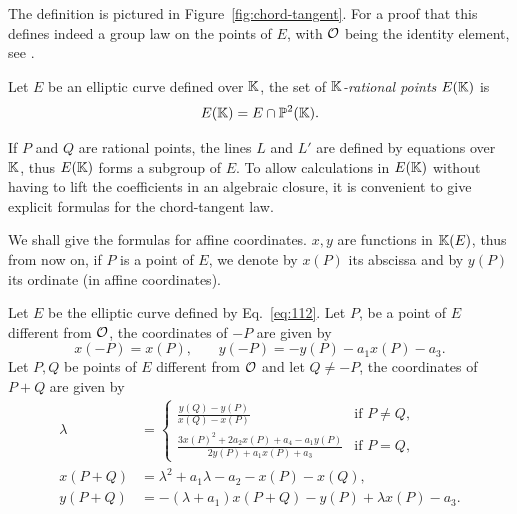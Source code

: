 The definition is pictured in Figure~\ref{fig:chord-tangent}. For a
proof that this defines indeed a group law on the points of $E$, with
$\mathcal{O}$ being the identity element, see \cite[II, $\S2$]{silverman:elliptic}.

\begin{definition}
  Let $E$ be an elliptic curve defined over $\mathbb{K}$, the set of
  \emph{$\mathbb{K}$-rational points} $E(\mathbb{K})$ is 
  \begin{equation}
    \label{eq:119}
    E(\mathbb{K}) = E \cap \mathbb{P}^2(\mathbb{K})
    \text{.}
  \end{equation}
\end{definition}

If $P$ and $Q$ are rational points, the lines $L$ and $L'$ are defined
by equations over $\mathbb{K}$, thus $E(\mathbb{K})$ forms a subgroup of $E$. To allow
calculations in $E(\mathbb{K})$ without having to lift the coefficients in an
algebraic closure, it is convenient to give explicit formulas for the
chord-tangent law. 

We shall give the formulas for affine coordinates. $x,y$ are functions
in $\mathbb{K}(E)$, thus from now on, if $P$ is a point of $E$, we denote by
$x(P)$ its abscissa and by $y(P)$ its ordinate (in affine coordinates).

\begin{proposition}
  Let $E$ be the elliptic curve defined by Eq.~\eqref{eq:112}. Let
  $P$, be a point of $E$ different from $\mathcal{O}$, the coordinates of $-P$
  are given by
  \begin{equation}
    \label{eq:120}
    x(-P) = x(P)\text{,}\qquad y(-P)=-y(P) -a_1x(P) - a_3
    \text{.}
  \end{equation}
  Let $P,Q$ be points of $E$ different from $\mathcal{O}$ and let $Q\ne-P$, the
  coordinates of $P+Q$ are given by
  \begin{equation}
    \label{eq:121}
    \begin{aligned}
      \lambda &= \begin{cases}
        \frac{y(Q) - y(P)}{x(Q) -x(P)} &\text{if $P\ne Q$,}\\
        \frac{3x(P)^2+2a_2x(P)+a_4-a_1y(P)}{2y(P)+a_1x(P)+a_3} &\text{if $P=Q$,}
      \end{cases}\\
      x(P+Q) &= \lambda^2+a_1\lambda-a_2-x(P)-x(Q)\text{,}\\
      y(P+Q) &= -(\lambda+a_1)x(P+Q) - y(P) + \lambda x(P)-a_3\text{.}
    \end{aligned}
  \end{equation}
\end{proposition}

